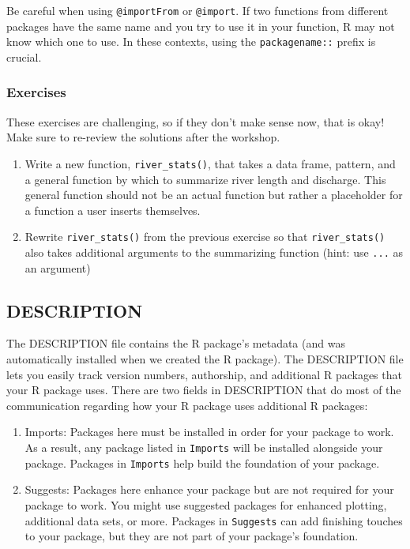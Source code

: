 \documentclass[
]{book}
\begin{document}
Be careful when using \texttt{@importFrom} or \texttt{@import}. If two functions from different packages have the same name and you try to use it in your function, R may not know which one to use. In these contexts, using the \texttt{packagename::} prefix is crucial.

\hypertarget{ex-set3}{%
\subsubsection{Exercises}\label{ex-set3}}

These exercises are challenging, so if they don't make sense now, that is okay! Make sure to re-review the solutions after the workshop.

\begin{enumerate}
\def\labelenumi{\arabic{enumi}.}
\item
  Write a new function, \texttt{river\_stats()}, that takes a data frame, pattern, and a general function by which to summarize river length and discharge. This general function should not be an actual function but rather a placeholder for a function a user inserts themselves.
\item
  Rewrite \texttt{river\_stats()} from the previous exercise so that \texttt{river\_stats()} also takes additional arguments to the summarizing function (hint: use \texttt{...} as an argument)
\end{enumerate}

\hypertarget{description}{%
\subsection{DESCRIPTION}\label{description}}

The DESCRIPTION file contains the R package's metadata (and was automatically installed when we created the R package). The DESCRIPTION file lets you easily track version numbers, authorship, and additional R packages that your R package uses. There are two fields in DESCRIPTION that do most of the communication regarding how your R package uses additional R packages:

\begin{enumerate}
\def\labelenumi{\arabic{enumi}.}
\item
  Imports: Packages here must be installed in order for your package to work. As a result, any package listed in \texttt{Imports} will be installed alongside your package. Packages in \texttt{Imports} help build the foundation of your package.
\item
  Suggests: Packages here enhance your package but are not required for your package to work. You might use suggested packages for enhanced plotting, additional data sets, or more. Packages in \texttt{Suggests} can add finishing touches to your package, but they are not part of your package's foundation.
\end{enumerate}
\end{document}
